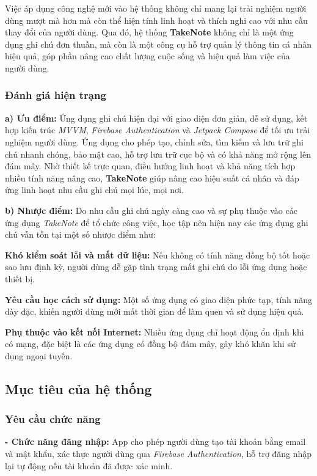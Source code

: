 \documentclass[a4paper,12pt]{article}
\begin{document}
Việc áp dụng công nghệ mới vào hệ thống không chỉ mang lại trải nghiệm người dùng mượt mà hơn mà còn thể hiện tính linh hoạt và thích nghi cao với nhu cầu thay đổi của người dùng. Qua đó, hệ thống \textbf{TakeNote} không chỉ là một ứng dụng ghi chú đơn thuần, mà còn là một công cụ hỗ trợ quản lý thông tin cá nhân hiệu quả, góp phần nâng cao chất lượng cuộc sống và hiệu quả làm việc của người dùng.

\subsubsection{Đánh giá hiện trạng}
\textbf{a) Ưu điểm:} Ứng dụng ghi chú hiện đại với giao diện đơn giản, dễ sử dụng, kết hợp kiến trúc \textit{MVVM}, \textit{Firebase Authentication} và \textit{Jetpack Compose} để tối ưu trải nghiệm người dùng. Ứng dụng cho phép tạo, chỉnh sửa, tìm kiếm và lưu trữ ghi chú nhanh chóng, bảo mật cao, hỗ trợ lưu trữ cục bộ và có khả năng mở rộng lên đám mây. Nhờ thiết kế trực quan, điều hướng linh hoạt và khả năng tích hợp nhiều tính năng nâng cao, \textbf{TakeNote} giúp nâng cao hiệu suất cá nhân và đáp ứng linh hoạt nhu cầu ghi chú mọi lúc, mọi nơi.

\textbf{b) Nhược điểm:} Do nhu cầu ghi chú ngày càng cao và sự phụ thuộc vào các ứng dụng \textit{TakeNote} để tổ chức công việc, học tập nên hiện nay các ứng dụng ghi chú vẫn tồn tại một số nhược điểm như:

\textbf{Khó kiểm soát lỗi và mất dữ liệu:} Nếu không có tính năng đồng bộ tốt hoặc sao lưu định kỳ, người dùng dễ gặp tình trạng mất ghi chú do lỗi ứng dụng hoặc thiết bị.

\textbf{Yêu cầu học cách sử dụng:} Một số ứng dụng có giao diện phức tạp, tính năng dày đặc, khiến người dùng mới mất thời gian để làm quen và sử dụng hiệu quả.

\textbf{Phụ thuộc vào kết nối Internet:} Nhiều ứng dụng chỉ hoạt động ổn định khi có mạng, đặc biệt là các ứng dụng có đồng bộ đám mây, gây khó khăn khi sử dụng ngoại tuyến.

\subsection{Mục tiêu của hệ thống}
\subsubsection{Yêu cầu chức năng}
\textbf{- Chức năng đăng nhập:} App cho phép người dùng tạo tài khoản bằng email và mật khẩu, xác thực người dùng qua \textit{Firebase Authentication}, hỗ trợ đăng nhập lại tự động nếu tài khoản đã được xác minh.
\end{document}
